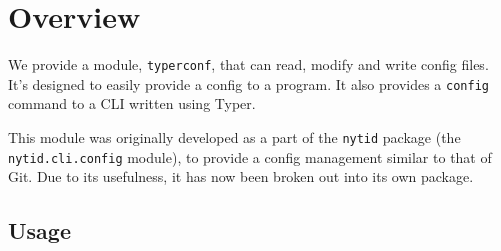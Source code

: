 \section{Overview}\label{Overview}

We provide a module, \texttt{typerconf}, that can read, modify and write config 
files.
It's designed to easily provide a config to a program.
It also provides a \texttt{config} command to a CLI written using Typer.

This module was originally developed as a part of the \texttt{nytid} package 
(the \texttt{nytid.cli.config} module), to provide a config management similar 
to that of Git.
Due to its usefulness, it has now been broken out into its own package.

\subsection{Usage}





